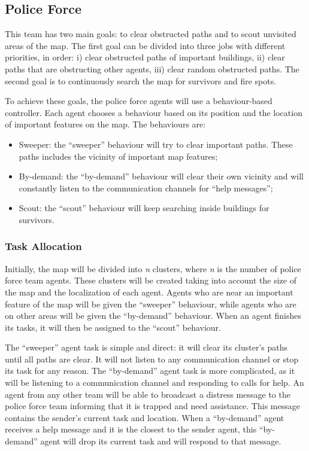 \subsection{Police Force}
\label{sec:police}
This team has two main goals: to clear obstructed paths and to scout unvisited areas of the map. The first goal can be divided into three jobs with different priorities, in order: i) clear obstructed paths of important buildings, ii) clear paths that are obstructing other agents, iii) clear random obstructed paths. The second goal is to continuously search the map for survivors and fire spots.

To achieve these goals, the police force agents will use a behaviour-based controller. Each agent chooses a behaviour based on its position and the location of important features on the map. The behaviours are:

\begin{itemize}

\item Sweeper: the ``sweeper'' behaviour will try to clear important paths. These paths includes the vicinity of important map features;

\item By-demand: the ``by-demand'' behaviour will clear their own vicinity and will constantly listen to the communication channels for ``help messages'';

\item Scout: the ``scout'' behaviour will keep searching inside buildings for survivors.

\end{itemize}

\subsubsection{Task Allocation}
Initially, the map will be divided into \emph{n} clusters, where \emph{n} is the number of police force team agents. These clusters will be created taking into account the size of the map and the localization of each agent. Agents who are near an important feature of the map will be given the ``sweeper'' behaviour, while agents who are on other areas will be given the ``by-demand'' behaviour. When an agent finishes its tasks, it will then be assigned to the ``scout'' behaviour.

The ``sweeper'' agent task is simple and direct: it will clear its cluster's paths until all paths are clear. It will not listen to any communication channel or stop its task for any reason. The ``by-demand'' agent task is more complicated, as it will be listening to a communication channel and responding  to calls for help. An agent from any other team will be able to broadcast a distress message to the police force team informing that it is trapped and need assistance. This message contains the sender's current task and location. When a ``by-demand'' agent receives a help message and it is the closest to the sender agent, this ``by-demand'' agent will drop its current task and will respond to that message.

